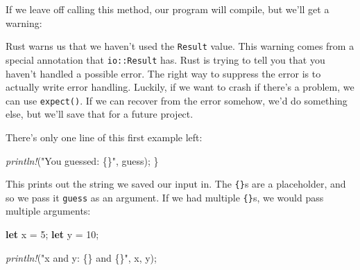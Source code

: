 \documentclass[a4paper,]{book}
\newenvironment{Shaded}{\begin{snugshade}}{\end{snugshade}}
\newcommand{\KeywordTok}[1]{\textcolor[rgb]{0.13,0.29,0.53}{\textbf{{#1}}}}
\newcommand{\DecValTok}[1]{\textcolor[rgb]{0.00,0.00,0.81}{{#1}}}
\newcommand{\StringTok}[1]{\textcolor[rgb]{0.31,0.60,0.02}{{#1}}}
\newcommand{\CommentTok}[1]{\textcolor[rgb]{0.56,0.35,0.01}{\textit{{#1}}}}
\newcommand{\PreprocessorTok}[1]{\textcolor[rgb]{0.56,0.35,0.01}{\textit{{#1}}}}
\newcommand{\NormalTok}[1]{{#1}}
\begin{document}
If we leave off calling this method, our program will compile, but we'll
get a warning:

\begin{Shaded}
\end{Shaded}

Rust warns us that we haven't used the \texttt{Result} value. This
warning comes from a special annotation that \texttt{io::Result} has.
Rust is trying to tell you that you haven't handled a possible error.
The right way to suppress the error is to actually write error handling.
Luckily, if we want to crash if there's a problem, we can use
\texttt{expect()}. If we can recover from the error somehow, we'd do
something else, but we'll save that for a future project.

There's only one line of this first example left:

\begin{Shaded}
\begin{Highlighting}[]
    \PreprocessorTok{println!}\NormalTok{(}\StringTok{"You guessed: \{\}"}\NormalTok{, guess);}
\NormalTok{\}}
\end{Highlighting}
\end{Shaded}

This prints out the string we saved our input in. The \texttt{\{\}}s are
a placeholder, and so we pass it \texttt{guess} as an argument. If we
had multiple \texttt{\{\}}s, we would pass multiple arguments:

\begin{Shaded}
\begin{Highlighting}[]
\KeywordTok{let} \NormalTok{x = }\DecValTok{5}\NormalTok{;}
\KeywordTok{let} \NormalTok{y = }\DecValTok{10}\NormalTok{;}

\PreprocessorTok{println!}\NormalTok{(}\StringTok{"x and y: \{\} and \{\}"}\NormalTok{, x, y);}
\end{Highlighting}
\end{Shaded}
\end{document}
